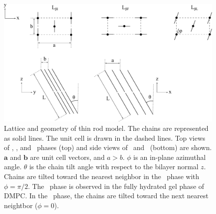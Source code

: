 \begin{figure}[htbp]
  \centering
  \includegraphics[width=\textwidth]{figures/ripple/thin_rod_model/gel_thin_rod}
  \caption[Lattice and geometry of thin rod model]
  {Lattice and geometry of thin rod model. 
  The chains are represented as solid lines. The unit cell is drawn
  in the dashed lines.
  Top views of \LbetaI, \LbetaF, and \LbetaL\ phases (top)
  and side views of \LbetaI\ and \LbetaF\ (bottom) are shown.
  $\mathbf{a}$ and $\mathbf{b}$ are unit cell vectors, and $a > b$.
  $\phi$ is an in-plane azimuthal angle. 
  $\theta$ is the chain tilt angle with respect to the bilayer normal $z$.  
  Chains are tilted toward the nearest neighbor in the \LbetaI\ phase with 
  $\phi=\pi/2$. The \LbetaI\ phase is observed in the fully hydrated gel 
  phase of DMPC. In the \LbetaF\ phase, the chains are tilted toward the next
  nearest neightbor ($\phi=0$).}
  \label{fig:gel_thin_rod}
\end{figure}

